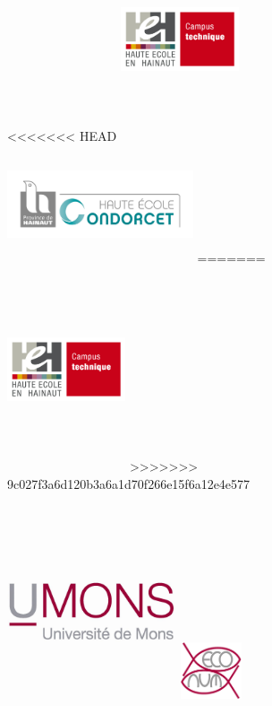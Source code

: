 \documentclass[]{report}
\title{}
\author{}
\date{}
\begin{document}
\begin{centering}

\begin{figure}

<<<<<<< HEAD
\includegraphics[width=3.5cm, height=6cm]{../image/technique-logo.jpg}
\includegraphics[width=5.5cm,height=3.5cm]{../image/condorcet.jpg}
=======
\includegraphics[width=3.5cm, height=6cm]{../image/technique-logo.jpg} 
>>>>>>> 9c027f3a6d120b3a6a1d70f266e15f6a12e4e577
\includegraphics[width=5cm,height=7cm]{../image/UMONS-logo.jpg}
\includegraphics[width=1.8cm,height=3.5cm]{../image/ECONUM-logo.pdf}


\end{figure}
\end{centering}
\end{document}
